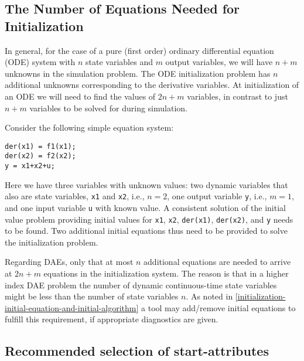\subsection{The Number of Equations Needed for Initialization}\label{the-number-of-equations-needed-for-initialization}

\begin{nonnormative}
In general, for the case of a pure (first order) ordinary
differential equation (ODE) system with $n$ state variables and $m$ output
variables, we will have $n+m$ unknowns in the simulation problem. The ODE
initialization problem has $n$ additional unknowns corresponding to the
derivative variables. At initialization of an ODE we will need to find
the values of $2n+m$ variables, in contrast to just $n+m$ variables to be
solved for during simulation.
\end{nonnormative}

\begin{example}
Consider the following simple equation system:
\begin{lstlisting}[language=modelica]
der(x1) = f1(x1);
der(x2) = f2(x2);
y = x1+x2+u;
\end{lstlisting}

Here we have three variables with unknown values: two dynamic
variables that also are state variables, \lstinline!x1! and \lstinline!x2!, i.e.,
$n=2$, one output variable \lstinline!y!, i.e., $m=1$, and one input variable \lstinline!u! with
known value. A consistent solution of the initial value problem
providing initial values for \lstinline!x1!, \lstinline!x2!, \lstinline!der(x1)!,
\lstinline!der(x2)!, and \lstinline!y! needs to be found. Two additional initial
equations thus need to be provided to solve the initialization problem.

Regarding DAEs, only that at most $n$ additional equations are
needed to arrive at $2n+m$ equations in the initialization system. The
reason is that in a higher index DAE problem the number of dynamic
continuous-time state variables might be less than the number of state
variables $n$. As noted in \cref{initialization-initial-equation-and-initial-algorithm} a tool may add/remove
initial equations to fulfill this requirement, if appropriate
diagnostics are given.
\end{example}

\subsection{Recommended selection of start-attributes}\label{recommended-selection-of-start-attributes}

